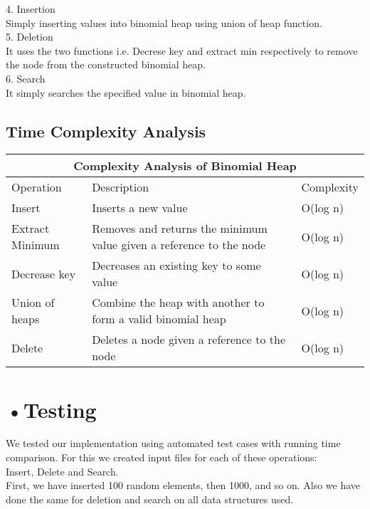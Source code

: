 \documentclass[10pt,a4paper]{article} ,
\begin{document}
	
4. Insertion
	\\Simply inserting values into binomial heap using union of heap function.\\
	
5. Deletion
	\\It uses the two functions i.e. Decrese key and extract min respectively to remove the node from the constructed binomial heap.\\
	
6. Search
	\\It simply searches the specified value in binomial heap.\\

\subsection*{Time Complexity Analysis}

\begin{tabular}{ |p{3cm}||p{6cm}||p{3cm}|  }
 \hline
 \multicolumn{3}{|c|}{Complexity Analysis of Binomial Heap} \\
 \hline
  Operation& Description & Complexity\\
 \hline
Insert & Inserts a new value  & O(log n)\\
Extract Minimum& Removes and returns the minimum value given a reference to the node & O(log n)   \\
Decrease key& Decreases an existing key to some value  &O(log n)\\
Union of heaps & Combine the heap with another to form a valid binomial heap  &O(log n)\\
Delete & Deletes a node given a reference to the node & O(log n)\\
 \hline
\end{tabular}


	\section*{•Testing} 
	
	We tested our implementation using automated test cases with running time comparison.
	For this we created input files for each of these operations:\\
	Insert, Delete and Search. \\ 

First, we have inserted 100 random elements, then 1000, and so on. 
Also we have done the same for deletion and search on all data structures used.\\
\end{document}
